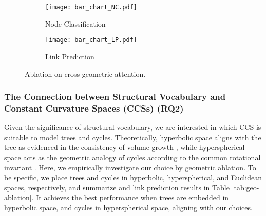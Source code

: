 \begin{figure}[t]
    \centering
    \begin{subfigure}{0.49\linewidth}
        \centering
        \texttt{[image: bar\_chart\_NC.pdf]}
        \caption{Node Classification}
        \label{fig:chart3}
    \end{subfigure}
    \begin{subfigure}{0.49\linewidth}
        \centering
        \texttt{[image: bar\_chart\_LP.pdf]}
        \caption{Link Prediction}
        \label{fig:chart2}
    \end{subfigure}
        \vspace{-0.15in}
    \caption{Ablation on cross-geometric attention.}
    \label{fig:attention}
    \vspace{-0.15in}
\end{figure}


\vspace{-0.07in}
\subsubsection{\textbf{The Connection between Structural Vocabulary and Constant Curvature Spaces (CCSs) (RQ2)}}
Given the significance of structural vocabulary, we are interested in which CCS is suitable to model trees and cycles.
Theoretically, 
hyperbolic space aligns with the tree as evidenced in the consistency of volume growth \cite{icml18HierarchiesofHyperbolic},
while hyperspherical space acts as the geometric analogy of cycles according to the common rotational invariant \cite{Petersen16}.
Here, we empirically investigate our choice by geometric ablation.
To be specific, we place trees and cycles in hyperbolic, hyperspherical, and Euclidean spaces, respectively,
and summarize and link prediction results in Table \ref{tab:geo-ablation}.
It achieves the best performance when trees are embedded in hyperbolic space, and cycles in hyperspherical space, aligning with our choices.



